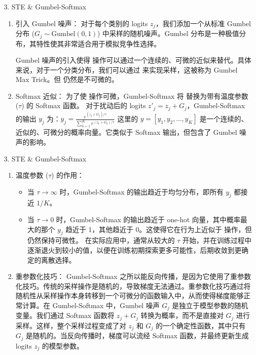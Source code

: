 \documentclass[aspectratio=169,10pt]{beamer}
\begin{document}
\begin{frame}[fragile,shrink=12]{3. STE \& Gumbel-Softmax}
\footnotesize
\begin{enumerate}
\def\labelenumi{\arabic{enumi}.}
\item
  \alert{引入 Gumbel 噪声：} 对于每个类别的 logits \(z_j\)，我们添加一个从标准 Gumbel 分布 (\(G_j \sim \text{Gumbel}(0, 1)\)) 中采样的随机噪声。Gumbel 分布是一种极值分布，其特性使其非常适合用于模拟竞争性选择。

  Gumbel 噪声的引入使得  操作可以通过一个连续的、可微的近似来替代。具体来说，对于一个分类分布，我们可以通过  来实现采样，这被称为 \alert{Gumbel Max Trick}。但  仍然是不可微的。
\item
  \alert{Softmax 近似：} 为了使  操作可微，Gumbel-Softmax 将  替换为带有温度参数 (\(\tau\)) 的 Softmax 函数。 对于扰动后的 logits \(z'_j = z_j + G_j\)，Gumbel-Softmax 的输出 \(y_j\) 为：\(y_j = \frac{e^{(z_j + G_j)/\tau}}{\sum_{k=1}^{K} e^{(z_k + G_k)/\tau}}\) 这里的 \(y = [y_1, y_2, \dots, y_K]\) 是一个\alert{连续的、近似的、可微分的}概率向量。它类似于 Softmax 输出，但包含了 Gumbel 噪声的影响。
\end{enumerate}
\end{frame}

\begin{frame}[fragile,shrink=12]{3. STE \& Gumbel-Softmax}
\footnotesize
\begin{enumerate}
\def\labelenumi{\arabic{enumi}.}
\setcounter{enumi}{2}
\item
  \alert{温度参数 (\(\tau\)) 的作用：}

  \begin{itemize}
  \item
    当 \(\tau \to \infty\) 时，Gumbel-Softmax 的输出趋近于均匀分布，即所有 \(y_j\) 都接近 \(1/K\)。
  \item
    当 \(\tau \to 0\) 时，Gumbel-Softmax 的输出趋近于 one-hot 向量，其中概率最大的那个 \(y_j\) 趋近于 1，其他趋近于 0。这使得它在行为上近似于  操作，但仍然保持可微性。 在实际应用中，通常从较大的 \(\tau\) 开始，并在训练过程中逐渐退火到较小的值，以便在训练初期探索更多可能性，后期收敛到更确定的离散选择。
  \end{itemize}
\item
  \alert{重参数化技巧：} Gumbel-Softmax 之所以能反向传播，是因为它使用了重参数化技巧。传统的采样操作是随机的，导致梯度无法通过。重参数化技巧通过将随机性从采样操作本身转移到\alert{一个可微分的函数输入}中，从而使得梯度能够正常计算。在 Gumbel-Softmax 中，Gumbel 噪声 \(G_j\) 是独立于模型参数的随机变量。我们通过 Softmax 函数将 \(z_j + G_j\) 转换为概率，而不是直接对 \(G_j\) 进行采样。这样，整个采样过程变成了对 \(z_j\) 和 \(G_j\) 的一个确定性函数，其中只有 \(G_j\) 是随机的。当反向传播时，梯度可以流经 Softmax 函数，并最终更新生成 logits \(z_j\) 的模型参数。
\end{enumerate}
\end{frame}
\end{document}
